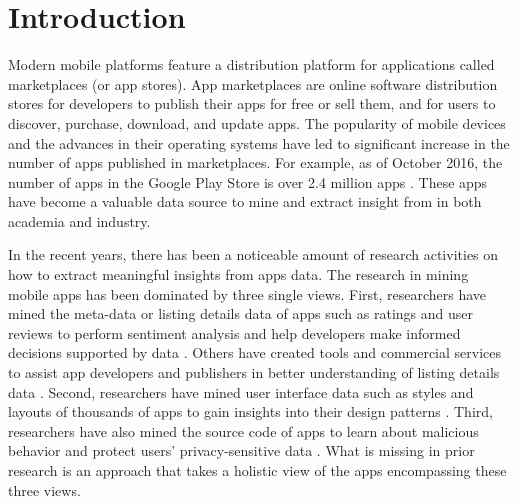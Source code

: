\chapter{Introduction}
\label{ch:intro__chapter}
Modern mobile platforms feature a distribution platform for applications called marketplaces (or app stores).
App marketplaces are online software distribution stores for developers to publish their apps for free or sell them, and for users to discover, purchase, download, and update apps.
The popularity of mobile devices and the advances in their operating systems have led to significant increase in the number of apps published in marketplaces.
For example, as of October 2016, the number of apps in the Google Play Store is over 2.4 million apps \cite{appbrain_play_apps}.
These apps have become a valuable data source to mine and extract insight from in both academia and industry.

In the recent years, there has been a noticeable amount of research activities on how to extract meaningful insights from apps data. 
The research in mining mobile apps has been dominated by three single views.
First, researchers have mined the meta-data or listing details data of apps such as ratings and user reviews to perform sentiment analysis and help developers make informed decisions supported by data \cite{fu_2013_KDD,chen_2014_ICSE,kong_2015_CCS}. 
Others have created tools and commercial services to assist app developers and publishers in better understanding of listing details data \cite{appfigures,applause,appannie}.
Second, researchers have mined user interface data such as styles and layouts of thousands of apps to gain insights into their design patterns \cite{shirazi_EICS_2013,Alharbi_2015_MobileHCI}.
Third, researchers have also mined the source code of apps to learn about malicious behavior and protect users' privacy-sensitive data \cite{zhou_2012_SP_dissecting,lu_2012_CCS,Arzt_2014_PLDI}.
What is missing in prior research is an approach that takes a holistic view of the apps encompassing these three views. 

